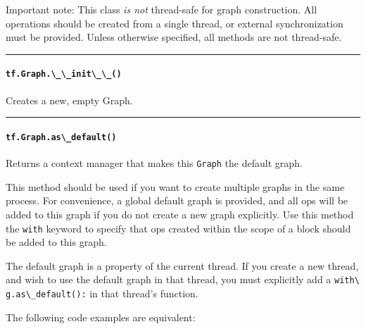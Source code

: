 Important note: This class \emph{is not} thread-safe for graph
construction. All operations should be created from a single thread, or
external synchronization must be provided. Unless otherwise specified,
all methods are not thread-safe.

\begin{center}\rule{0.5\linewidth}{\linethickness}\end{center}

\paragraph{\texorpdfstring{\lstinline{tf.Graph.\_\_init\_\_()}
}{tf.Graph.\_\_init\_\_() }}\label{tf.graph.ux5fux5finitux5fux5f}

Creates a new, empty Graph.

\begin{center}\rule{0.5\linewidth}{\linethickness}\end{center}

\paragraph{\texorpdfstring{\lstinline{tf.Graph.as\_default()}
}{tf.Graph.as\_default() }}\label{tf.graph.asux5fdefault}

Returns a context manager that makes this \lstinline{Graph} the default
graph.

This method should be used if you want to create multiple graphs in the
same process. For convenience, a global default graph is provided, and
all ops will be added to this graph if you do not create a new graph
explicitly. Use this method the \lstinline{with} keyword to specify that
ops created within the scope of a block should be added to this graph.

The default graph is a property of the current thread. If you create a
new thread, and wish to use the default graph in that thread, you must
explicitly add a \lstinline{with\ g.as\_default():} in that thread's
function.

The following code examples are equivalent:

\begin{Shaded}
\begin{Highlighting}[]
\OperatorTok{=} 
 
  \OperatorTok{=} \NormalTok{)}
    

  
  \OperatorTok{=} \NormalTok{)}
    
\end{Highlighting}
\end{Shaded}

